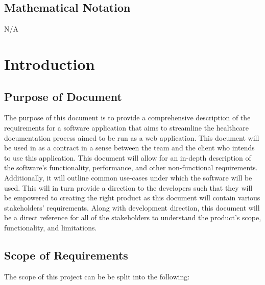 \documentclass[12pt]{article}
\begin{document}
\subsection{Mathematical Notation}
N/A

\newpage



\section{Introduction}

\subsection{Purpose of Document} \label{sec_PurposeOfDocument}

The purpose of this document is to provide a comprehensive description of the requirements for a software application that aims to streamline the healthcare documentation process aimed to be run as a web application. This document will be used in as a contract in a sense between the team and the client who intends to use this application. This document will allow for an in-depth description of the software's functionality, performance, and other non-functional requirements. Additionally, it will outline common use-cases under which the software will be used. This will in turn provide a direction to the developers such that they will be empowered to creating the right product as this document will contain various stakeholders' requirements. Along with development direction, this document will be a direct reference for all of the stakeholders to understand the product's scope, functionality, and limitations.

\subsection{Scope of Requirements} \label{sec_ScopeOfRequirements}

The scope of this project can be be split into the following:
\end{document}
